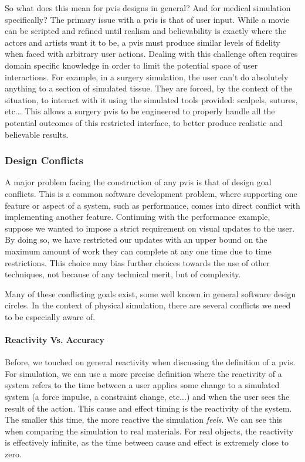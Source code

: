 So what does this mean for \gls{pvis} designs in general? And for medical
simulation specifically? The primary issue with a \gls{pvis} is that of user
input. While a movie can be scripted and refined until realism and
believability is exactly where the actors and artists want it to be, a
\gls{pvis} must produce similar levels of fidelity when faced with arbitrary
user actions. Dealing with this challenge often requires domain
specific knowledge in order to limit the potential space of user
interactions. For example, in a surgery simulation, the user can't do
absolutely anything to a section of simulated tissue. They are forced,
by the context of the situation, to interact with it using the
simulated tools provided: scalpels, sutures, etc... This allows a
surgery \gls{pvis} to be engineered to properly handle all the potential
outcomes of this restricted interface, to better produce realistic and
believable results.

\subsubsection{Design Conflicts}

A major problem facing the construction of any \gls{pvis} is that of
design goal conflicts. This is a common software development problem,
where supporting one feature or aspect of a system, such as
performance, comes into direct conflict with implementing another
feature. Continuing with the performance example, suppose we wanted to
impose a strict requirement on visual updates to the user. By doing
so, we have restricted our updates with an upper bound on the maximum
amount of work they can complete at any one time due to time
restrictions. This choice may bias further choices towards the use of
other techniques, not because of any technical merit, but of
complexity.

Many of these conflicting goals exist, some well known in general
software design circles. In the context of physical simulation, there
are several conflicts we need to be especially aware of.


\paragraph{Reactivity Vs. Accuracy}
Before, we touched on general reactivity when discussing the definition
of a \gls{pvis}. For simulation, we can use a more precise definition where the
reactivity of a system refers to the time between a user applies some
change to a simulated system (a force impulse, a constraint change,
etc...) and when the user sees the result of the action. This cause
and effect timing is the reactivity of the system. The smaller this
time, the more reactive the simulation \textit{feels}. We can see this
when comparing the simulation to real materials. For real objects, the
reactivity is effectively infinite, as the time between cause and
effect is extremely close to zero.

